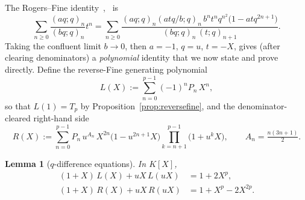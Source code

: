 \documentclass[11pt]{article}
\newtheorem{lemma}[theorem]{Lemma}
\theoremstyle{definition}
\begin{document}
The Rogers--Fine identity~\cite[Ch.~14]{Fine1988},~\cite{AndrewsJelinek2014} is
\[
  \sum_{n\ge0}\frac{(aq;q)_n}{(bq;q)_n}t^{n}
  =\sum_{n\ge0}\frac{(aq;q)_n(atq/b;q)_n\,b^{n}t^{n}q^{n^2}\bigl(1-atq^{2n+1}\bigr)}{(bq;q)_n\,(t;q)_{n+1}} .
\]
Taking the confluent limit $b\to 0$, then $a=-1$, $q=u$, $t=-X$, gives (after clearing denominators) a \emph{polynomial} identity that we now state and prove directly. Define the reverse-Fine generating polynomial
\[
  L(X):=\sum_{n=0}^{p-1}(-1)^{n}P_n\,X^{n},
\]
so that $L(1)=T_p$ by Proposition~\ref{prop:reversefine}, and the denominator-cleared right-hand side
\[
  R(X):=\sum_{n=0}^{p-1} P_n\,u^{A_n}\,X^{2n}\bigl(1-u^{2n+1}X\bigr)\!\!\prod_{k=n+1}^{p-1}\!\bigl(1+u^{k}X\bigr),
  \qquad A_n=\tfrac{n(3n+1)}{2}.
\]

\begin{lemma}[$q$-difference equations]\label{lem:rfqdiff}
In $K[X]$,
\begin{align}
  (1+X)\,L(X)+uX\,L(uX) &= 1+2X^{p}, \label{eq:Lqdiff}\\
  (1+X)\,R(X)+uX\,R(uX) &= 1+X^{p}-2X^{2p}. \label{eq:Rqdiff}
\end{align}
\end{lemma}
\end{document}
